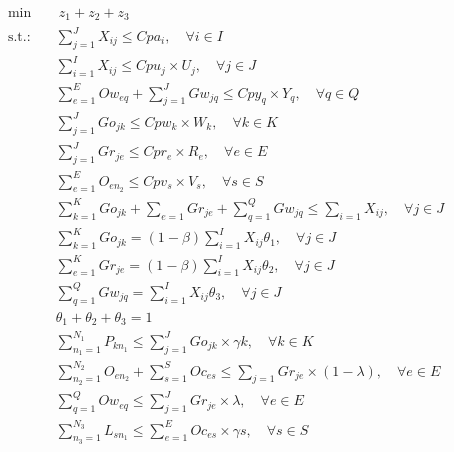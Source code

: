 \documentclass[a4paper]{ifacconf}
\begin{document}
\begin{align}
    \min &\ z_1 + z_2 + z_3 \label{eq:custo}\\
    \text{s.t.:} \quad & \sum\limits_{j=1}^J X_{ij} \le Cpa_i, \quad \forall i \in I \label{eq:restricao1}\\
    & \sum\limits_{i=1}^I X_{ij} \le Cpu_j\times U_j, \quad \forall j \in J \label{eq:restricao2}\\
    & \sum\limits_{e=1}^E Ow_{eq} + \sum\limits_{j=1}^J Gw_{jq} \le Cpy_q \times Y_q, \quad \forall q \in Q \label{eq:restricao3}\\
    & \sum\limits_{j=1}^J Go_{jk} \le Cpw_k\times W_k, \quad \forall k \in K \label{eq:restricao4}\\
    & \sum\limits_{j=1}^J Gr_{je} \le Cpr_e\times R_e, \quad \forall e \in E \label{eq:restricao5}\\
    & \sum\limits_{e=1}^E O_{en_2} \le Cpv_s\times V_s, \quad \forall s \in S \label{eq:restricao6}\\
    & \sum\limits_{k=1}^K Go_{jk} + \sum\limits_{e=1} Gr_{je} + \sum\limits_{q=1}^Q Gw_{jq} \le \sum\limits_{i=1} X_{ij}, \quad \forall j \in J \label{eq:restricao7} \\
    & \sum\limits_{k=1}^K Go_{jk} = (1-\beta) \sum\limits_{i=1}^I X_{ij}\theta_1, \quad \forall j\in J \label{eq:restricao8}\\
    & \sum\limits_{e=1}^K Gr_{je} = (1-\beta) \sum\limits_{i=1}^I X_{ij}\theta_2, \quad \forall j\in J \label{eq:restricao9}\\
    & \sum\limits_{q=1}^Q Gw_{jq} = \sum\limits_{i=1}^I X_{ij}\theta_3, \quad \forall j\in J \label{eq:restricao10}\\
    & \theta_1 + \theta_2 + \theta_3 = 1 \label{eq:restricao11} \\
    & \sum\limits_{n_1=1}^{N_1} P_{kn_1} \le \sum\limits_{j=1}^J Go_{jk} \times \gamma k, \quad \forall k \in K \label{eq:restricao12}\\
    & \sum\limits_{n_2=1}^{N_2} O_{en_2} + \sum\limits_{s=1}^S Oc_{es} \le \sum\limits_{j=1} Gr_{je}\times(1-\lambda), \quad \forall e\in E \label{eq:restricao13}\\
    & \sum\limits_{q=1}^{Q} Ow_{eq} \le \sum\limits_{j=1}^J Gr_{je} \times \lambda, \quad \forall e \in E \label{eq:restricao14}\\
    & \sum\limits_{n_3=1}^{N_3} L_{sn_1} \le \sum\limits_{e=1}^E Oc_{es} \times \gamma s, \quad \forall s \in S \label{eq:restricao15}
\end{align}
\end{document}
